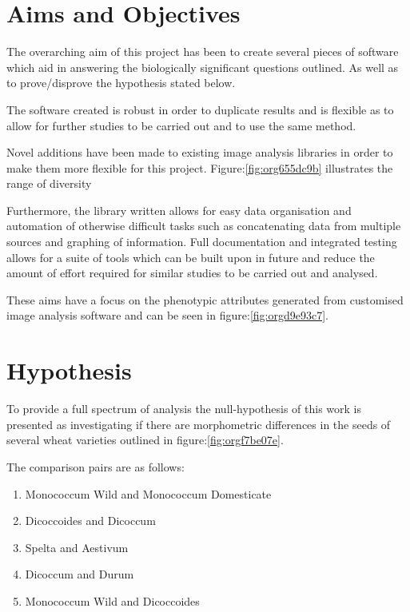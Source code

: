 \documentclass[11pt]{report}
\begin{document}
\section{Aims and Objectives}
\label{sec:org28cd927}

The overarching aim of this project has been to create several pieces of software which aid in answering the biologically significant questions outlined. As well as to prove/disprove the hypothesis stated below.

The software created is robust in order to duplicate results and is flexible as to allow for further studies to be carried out and to use the same method.

Novel additions have been made to existing image analysis libraries in order to make them more flexible for this project. Figure:\ref{fig:org655dc9b} illustrates the range of diversity

Furthermore, the library written allows for easy data organisation and automation of otherwise difficult tasks such as concatenating data from multiple sources and graphing of information. Full documentation and integrated testing allows for a suite of tools which can be built upon in future and reduce the amount of effort required for similar studies to be carried out and analysed.

These aims have a focus on the phenotypic attributes generated from customised image analysis software \cite{Hughes2017} and can be seen in figure:\ref{fig:orgd9e93c7}.


\section{Hypothesis}
\label{sec:org9db7400}
To provide a full spectrum of analysis the null-hypothesis of this work is presented as investigating if there are morphometric differences in the seeds of several wheat varieties outlined in figure:\ref{fig:orgf7be07e}.

The comparison pairs are as follows:

\begin{enumerate}
\item Monococcum Wild and Monococcum Domesticate
\item Dicoccoides and Dicoccum
\item Spelta and Aestivum
\item Dicoccum and Durum
\item Monococcum Wild and Dicoccoides
\end{enumerate}
\end{document}
